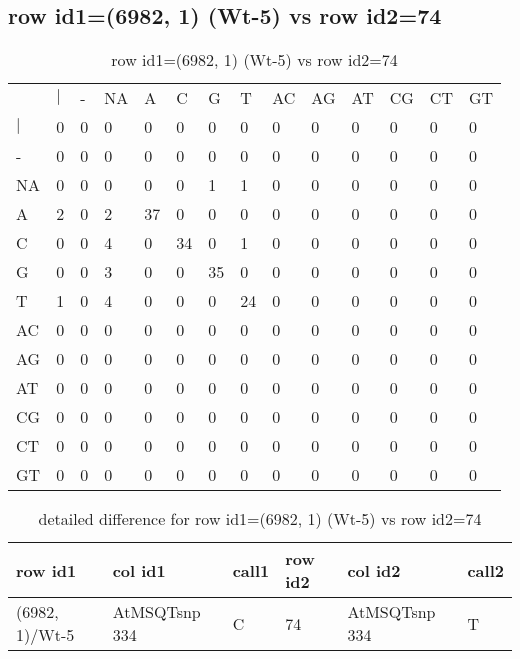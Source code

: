 \subsection{row id1=(6982, 1) (Wt-5) vs row id2=74}
\begin{center}
\begin{longtable}{|l|l|l|l|l|l|l|l|l|l|l|l|l|l|}
\caption{row id1=(6982, 1) (Wt-5) vs row id2=74} \label{table_dm206}\\
\hline
\\
\hline
&$|$&-&NA&A&C&G&T&AC&AG&AT&CG&CT&GT\\
$|$&0&0&0&0&0&0&0&0&0&0&0&0&0\\
-&0&0&0&0&0&0&0&0&0&0&0&0&0\\
NA&0&0&0&0&0&1&1&0&0&0&0&0&0\\
A&2&0&2&37&0&0&0&0&0&0&0&0&0\\
C&0&0&4&0&34&0&1&0&0&0&0&0&0\\
G&0&0&3&0&0&35&0&0&0&0&0&0&0\\
T&1&0&4&0&0&0&24&0&0&0&0&0&0\\
AC&0&0&0&0&0&0&0&0&0&0&0&0&0\\
AG&0&0&0&0&0&0&0&0&0&0&0&0&0\\
AT&0&0&0&0&0&0&0&0&0&0&0&0&0\\
CG&0&0&0&0&0&0&0&0&0&0&0&0&0\\
CT&0&0&0&0&0&0&0&0&0&0&0&0&0\\
GT&0&0&0&0&0&0&0&0&0&0&0&0&0\\
\hline
\end{longtable}
\end{center}

\begin{center}
\begin{longtable}{|l|l|l|l|l|l|}
\caption{detailed difference for row id1=(6982, 1) (Wt-5) vs row id2=74} \label{table_dm207}\\
\hline
row id1&col id1&call1&row id2&col id2&call2\\
\hline
(6982, 1)/Wt-5&AtMSQTsnp 334&C&74&AtMSQTsnp 334&T\\
\hline
\end{longtable}
\end{center}

